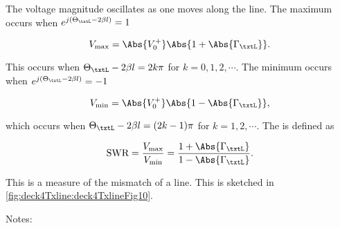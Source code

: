 The voltage magnitude oscillates as one moves along the line.  The maximum occurs when \( e^{j (\Theta_\txtL -2 \beta l)}  = 1 \)

\begin{equation}\label{eqn:uwaves4TransmissionLines:1160}
V_{\mathrm{max}} = \Abs{V_0^{+}} \Abs{ 1 + \Abs{\Gamma_\txtL} }.
\end{equation}

This occurs when \( \Theta_\txtL - 2 \beta l = 2 k \pi \) for \( k = 0, 1, 2, \cdots \).  The minimum occurs when \( e^{j (\Theta_\txtL -2 \beta l)}  = -1 \)

\begin{equation}\label{eqn:uwaves4TransmissionLines:1180}
V_{\mathrm{min}} = \Abs{V_0^{+}} \Abs{ 1 - \Abs{\Gamma_\txtL} },
\end{equation}

which occurs when \( \Theta_\txtL - 2 \beta l = (2 k - 1 )\pi \) for \( k = 1, 2, \cdots \).  The  is defined as

\begin{equation}\label{eqn:uwaves4TransmissionLines:1200}
\textrm{SWR} = \frac{V_{\mathrm{max}}}{V_{\mathrm{min}}} = \frac{ 1 + \Abs{\Gamma_\txtL} }{ 1 - \Abs{\Gamma_\txtL} }.
\end{equation}

This is a measure of the mismatch of a line.  This is sketched in \cref{fig:deck4Txline:deck4TxlineFig10}.


Notes:

